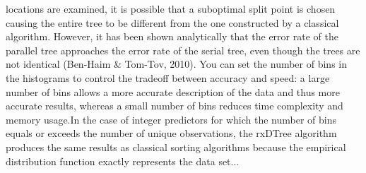locations are examined, it is possible that a suboptimal split point is chosen causing the entire tree to be different from the one constructed by a classical algorithm. However, it has been shown analytically that the error rate of the parallel tree approaches the error rate of the serial tree, even though the trees are not identical (Ben-Haim & Tom-Tov, 2010). You can set the number of bins in the histograms to control the tradeoff between accuracy and speed: a large number of bins allows a more accurate description of the data and thus more accurate results, whereas a small number of bins reduces time complexity and memory usage.In the case of integer predictors for which the number of bins equals or exceeds the number of unique observations, the rxDTree algorithm produces the same results as classical  sorting 
algorithms because the empirical distribution function exactly represents the data set...
